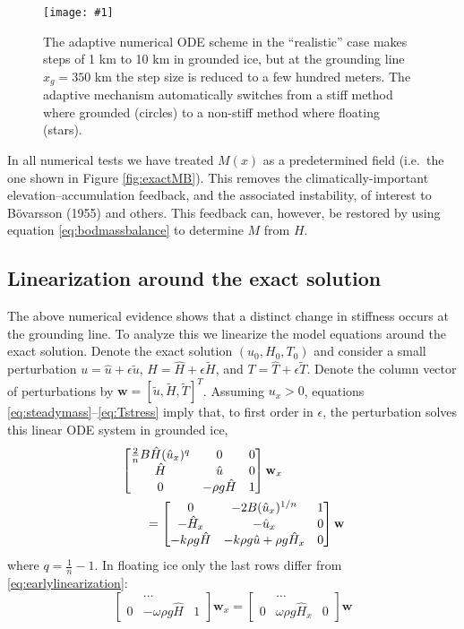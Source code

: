\documentclass[twocolumn,letterpaper]{igs}
\renewcommand{\dh}{\fontencoding{T1}\selectfont{\symbol{240}}}
\newcommand{\onecol}[1]{\texttt{[image: \#1]}}
\newcommand{\citebod}{B\"o\dh varsson (1955)\nocite{Bodvardsson}\xspace}
\newcommand{\bw}{\mathbf{w}}
\newcommand{\hu}{\hat u}
\newcommand{\hH}{\hat H}
\newcommand{\hT}{\hat T}
\newcommand{\tu}{\tilde u}
\newcommand{\tH}{\tilde H}
\newcommand{\tT}{\tilde T}
\newcommand{\eps}{\epsilon}
\begin{document}
\begin{figure}[ht]
\onecol{em-dt-adaptive}
\caption{The adaptive numerical ODE scheme in the ``realistic'' case makes steps of 1 km to 10 km in grounded ice, but at the grounding line $x_g=350$ km the step size is reduced to a few hundred meters.  The adaptive mechanism automatically switches from a stiff method where grounded (circles) to a non-stiff method where floating (stars).} \label{fig:shoot-dt-adaptive}
\end{figure}

In all numerical tests we have treated $M(x)$ as a predetermined field (i.e.~the one shown in Figure \ref{fig:exactMB}).  This removes the climatically-important elevation--accumulation feedback, and the associated instability, of interest to \citebod and others.  This feedback can, however, be restored by using equation \eqref{eq:bodmassbalance} to determine $M$ from $H$.


\subsection*{Linearization around the exact solution}  The above numerical evidence shows that a distinct change in stiffness occurs at the grounding line.  To analyze this we linearize the model equations around the exact solution.  Denote the exact solution $(u_0,H_0,T_0)$ and consider a small perturbation $u = \hu + \eps \tu$, $H = \hH + \eps \tH$, and $T = \hT + \eps \tT$.  Denote the column vector of perturbations by $\bw = [\tu, \tH, \tT]^T$.  Assuming $u_x > 0$, equations \eqref{eq:steadymass}--\eqref{eq:Tstress} imply that, to first order in $\eps$, the perturbation solves this linear ODE system in grounded ice,
\begin{align}
&\begin{bmatrix}
\frac{2}{n} B \hH (\hu_x)^q & 0 & 0 \\
\hH & \hu & 0 \\
0 & -\rho g \hH & 1
\end{bmatrix}
\bw_x \notag \\
&\qquad =
\begin{bmatrix}
0 & - 2 B (\hu_x)^{1/n} & 1 \\
- \hH_x & - \hu_x & 0 \\
-k \rho g \hH & - k \rho g \hu + \rho g \hH_x & 0
\end{bmatrix}
\bw  \label{eq:earlylinearization}
\end{align}
where $q = \frac{1}{n} - 1$.  In floating ice only the last rows differ from \eqref{eq:earlylinearization}:
\begin{equation}
\begin{bmatrix}
 & \dots & \\
0 & - \omega \rho g \hH & 1
\end{bmatrix}
\bw_x
=
\begin{bmatrix}
 & \dots & \\
0 & \omega \rho g \hH_x & 0
\end{bmatrix}
\bw
\label{eq:floatinglinearization}
\end{equation}
\end{document}
